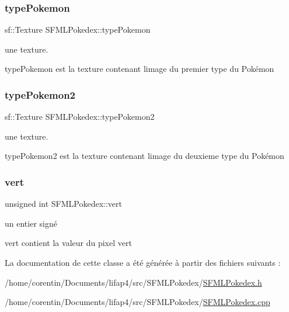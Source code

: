 \subsubsection{\texorpdfstring{type\+Pokemon}{typePokemon}}
{\footnotesize\ttfamily sf\+::\+Texture S\+F\+M\+L\+Pokedex\+::type\+Pokemon\hspace{0.3cm}{\ttfamily [private]}}



une texture. 

type\+Pokemon est la texture contenant l\textquotesingle{}image du premier type du Pokémon \mbox{\label{class_s_f_m_l_pokedex_abd3915db6d7443e178ee3e70c5759169}} 
\subsubsection{\texorpdfstring{type\+Pokemon2}{typePokemon2}}
{\footnotesize\ttfamily sf\+::\+Texture S\+F\+M\+L\+Pokedex\+::type\+Pokemon2\hspace{0.3cm}{\ttfamily [private]}}



une texture. 

type\+Pokemon2 est la texture contenant l\textquotesingle{}image du deuxieme type du Pokémon \mbox{\label{class_s_f_m_l_pokedex_aa310919f725f9aadde9a77849cb18bf5}} 
\subsubsection{\texorpdfstring{vert}{vert}}
{\footnotesize\ttfamily unsigned int S\+F\+M\+L\+Pokedex\+::vert\hspace{0.3cm}{\ttfamily [private]}}



un entier signé 

vert contient la valeur du pixel vert 

La documentation de cette classe a été générée à partir des fichiers suivants \+:\begin{DoxyCompactItemize}
\item 
/home/corentin/\+Documents/lifap4/src/\+S\+F\+M\+L\+Pokedex/\hyperlink{_s_f_m_l_pokedex_8h}{S\+F\+M\+L\+Pokedex.\+h}\item 
/home/corentin/\+Documents/lifap4/src/\+S\+F\+M\+L\+Pokedex/\hyperlink{_s_f_m_l_pokedex_8cpp}{S\+F\+M\+L\+Pokedex.\+cpp}\end{DoxyCompactItemize}
